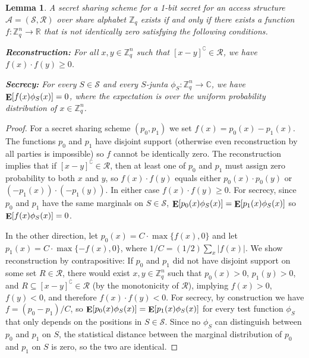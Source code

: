 \documentclass[11pt]{article}
\numberwithin{equation}{section}
\newtheorem{lemma}[theorem]{Lemma}
\theoremstyle{definition}
\theoremstyle{plain}
\newcommand{\R}{\mathbb R}
\newcommand{\Z}{\mathbb Z}
\DeclareMathOperator\E{\mathop{\bf E}}
\def\calA{\mathcal{A}}
\def\calS{\mathcal{S}}
\def\calR{\mathcal{R}}
\providecommand\abs[1]{\lvert#1\rvert}
\providecommand\compl[1]{#1^{\complement}}
\begin{document}
\begin{lemma}
\label{lemma:sdp}
A secret sharing scheme for a 1-bit secret for
%
%
an access structure
$\calA=(\calS,\calR)$ over share alphabet $\Z_q$ exists if and only if 
there exists a function $f\colon \Z_q^n \to \R$ that is not 
identically zero satisfying the following 
%
conditions.    %
\begin{description}
\label{en:SDP}
\item \textbf{Reconstruction:} For all $x, y \in\mathbb{Z}_q^n$ such that
$\compl{[x - y]} \in \calR$,
we have  $f(x)\cdot f(y) \geq 0$.
\item \textbf{Secrecy:} For every $S \in \calS$ and every $S$-junta
$\phi_S\colon \Z_q^n \to \mathbb{C}$, we have  
$\E[f(x) \phi_S(x)] = 0$, where the
expectation is over the uniform probability distribution of $x\in\Z_q^n$.
\end{description}
\end{lemma}
\begin{proof}
For a secret sharing scheme $(p_0,p_1)$ 
we set $f(x) = p_0(x) - p_1(x)$.  The functions $p_0$ and $p_1$ have disjoint
support (otherwise even reconstruction by all parties is impossible) 
so $f$ cannot be identically zero.  The reconstruction implies that if $\compl{[x - y]} \in \calR$, then at least one of $p_0$ and $p_1$ must assign zero probability to both $x$ and $y$, so $f(x) \cdot f(y)$ equals either $p_0(x) \cdot p_0(y)$ or $(-p_1(x)) \cdot (-p_1(y))$.  In either case $f(x) \cdot f(y) \geq 0$.
For secrecy, since $p_0$ and $p_1$ have the same marginals on 
$S \in \calS$, $\E[p_0(x) \phi_S(x)]  = \E[p_1(x) \phi_S(x)]$ so 
$\E[f(x) \phi_S(x)] = 0$.
	
In the other direction, let $p_0(x) = C\cdot \max\{f(x), 0\}$ and let
$p_1(x) =C\cdot \max\{-f(x),\allowbreak 0\}$, where 
$1/C = (1/2) \sum_x \abs{f(x)}$. 
We show reconstruction by contrapositive: If $p_0$ and $p_1$ did not have
disjoint support on some set $R \in \calR$, there would exist $x, y \in
\Z_q^n$ such that $p_0(x) > 0$, $p_1(y) > 0$, and $R \subseteq \compl{[x -
y]} \in \calR$  (by the monotonicity of $\calR$), implying $f(x) > 0$,
$f(y) < 0$, and therefore $f(x) \cdot f(y) < 0$.
For secrecy, by construction we have 
$f = (p_0 - p_1)/C$, so $\E[p_0(x) \phi_S(x)] = \E[p_1(x) \phi_S(x)]$ 
for every test function $\phi_S$ that only depends on the positions in 
$S \in \calS$.  Since no $\phi_S$ can distinguish between $p_0$ and 
$p_1$ on $S$, the statistical distance between the marginal distribution 
of $p_0$ and $p_1$ on $S$ is zero, so the two are identical.
\end{proof}
\end{document}
